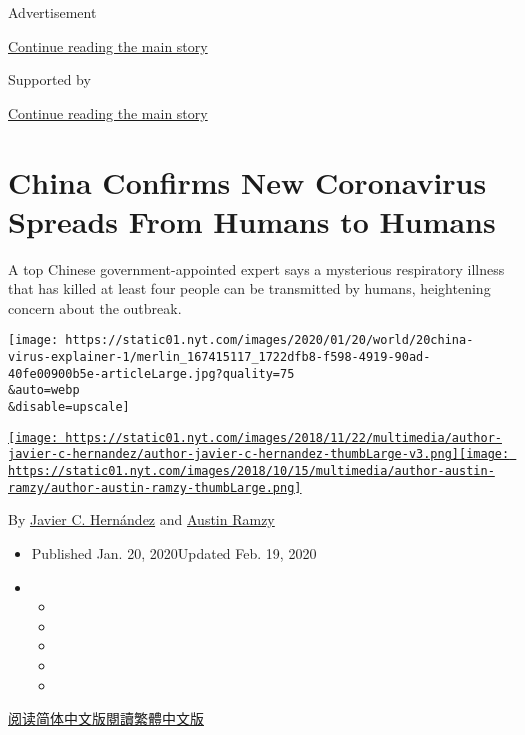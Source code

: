 Advertisement

\protect\hyperlink{after-top}{Continue reading the main story}

Supported by

\protect\hyperlink{after-sponsor}{Continue reading the main story}

\hypertarget{china-confirms-new-coronavirus-spreads-from-humans-to-humans}{%
\section{China Confirms New Coronavirus Spreads From Humans to
Humans}\label{china-confirms-new-coronavirus-spreads-from-humans-to-humans}}

A top Chinese government-appointed expert says a mysterious respiratory
illness that has killed at least four people can be transmitted by
humans, heightening concern about the outbreak.

\texttt{[image: https://static01.nyt.com/images/2020/01/20/world/20china-virus-explainer-1/merlin\_167415117\_1722dfb8-f598-4919-90ad-40fe00900b5e-articleLarge.jpg?quality=75\\\&auto=webp\\\&disable=upscale]}

\href{https://www.nytimes.com/by/javier-c-hernandez}{\texttt{[image: https://static01.nyt.com/images/2018/11/22/multimedia/author-javier-c-hernandez/author-javier-c-hernandez-thumbLarge-v3.png]}}\href{https://www.nytimes.com/by/austin-ramzy}{\texttt{[image: https://static01.nyt.com/images/2018/10/15/multimedia/author-austin-ramzy/author-austin-ramzy-thumbLarge.png]}}

By \href{https://www.nytimes.com/by/javier-c-hernandez}{Javier C.
Hernández} and \href{https://www.nytimes.com/by/austin-ramzy}{Austin
Ramzy}

\begin{itemize}
\item
  Published Jan. 20, 2020Updated Feb. 19, 2020
\item
  \begin{itemize}
  \item
  \item
  \item
  \item
  \item
  \end{itemize}
\end{itemize}

\href{https://cn.nytimes.com/china/20200121/coronavirus-china-symptoms/}{阅读简体中文版}\href{https://cn.nytimes.com/china/20200121/coronavirus-china-symptoms/zh-hant/}{閱讀繁體中文版}

